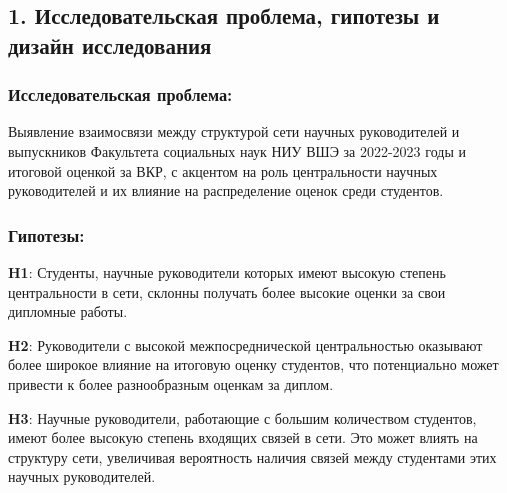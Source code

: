 \documentclass[
]{article}
\begin{document}
\hypertarget{ux438ux441ux441ux43bux435ux434ux43eux432ux430ux442ux435ux43bux44cux441ux43aux430ux44f-ux43fux440ux43eux431ux43bux435ux43cux430-ux433ux438ux43fux43eux442ux435ux437ux44b-ux438-ux434ux438ux437ux430ux439ux43d-ux438ux441ux441ux43bux435ux434ux43eux432ux430ux43dux438ux44f}{%
\subsection{1. Исследовательская проблема, гипотезы и дизайн
исследования}\label{ux438ux441ux441ux43bux435ux434ux43eux432ux430ux442ux435ux43bux44cux441ux43aux430ux44f-ux43fux440ux43eux431ux43bux435ux43cux430-ux433ux438ux43fux43eux442ux435ux437ux44b-ux438-ux434ux438ux437ux430ux439ux43d-ux438ux441ux441ux43bux435ux434ux43eux432ux430ux43dux438ux44f}}

\hypertarget{ux438ux441ux441ux43bux435ux434ux43eux432ux430ux442ux435ux43bux44cux441ux43aux430ux44f-ux43fux440ux43eux431ux43bux435ux43cux430}{%
\subsubsection{Исследовательская
проблема:}\label{ux438ux441ux441ux43bux435ux434ux43eux432ux430ux442ux435ux43bux44cux441ux43aux430ux44f-ux43fux440ux43eux431ux43bux435ux43cux430}}

Выявление взаимосвязи между структурой сети научных руководителей и
выпускников Факультета социальных наук НИУ ВШЭ за 2022-2023 годы и
итоговой оценкой за ВКР, с акцентом на роль центральности научных
руководителей и их влияние на распределение оценок среди студентов.

\hypertarget{ux433ux438ux43fux43eux442ux435ux437ux44b}{%
\subsubsection{Гипотезы:}\label{ux433ux438ux43fux43eux442ux435ux437ux44b}}

\textbf{H1}: Студенты, научные руководители которых имеют высокую
степень центральности в сети, склонны получать более высокие оценки за
свои дипломные работы.

\textbf{H2}: Руководители с высокой межпосреднической центральностью
оказывают более широкое влияние на итоговую оценку студентов, что
потенциально может привести к более разнообразным оценкам за диплом.

\textbf{H3}: Научные руководители, работающие с большим количеством
студентов, имеют более высокую степень входящих связей в сети. Это может
влиять на структуру сети, увеличивая вероятность наличия связей между
студентами этих научных руководителей.
\end{document}

